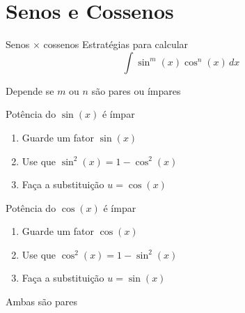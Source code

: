 \documentclass[fleqn,utf8,aspectratio=169,12pt]{beamer}
\begin{document}
\section{Senos e Cossenos}

\begin{frame}{Senos $\times$ cossenos}
  Estratégias para calcular
  \[
    \int \sin^m(x) \cos^n(x)\,dx
  \]

  Depende se $m$ ou $n$ são pares ou ímpares
\end{frame}

\begin{frame}{Potência do $\sin(x)$ é ímpar}
  \begin{enumerate}[<+->]
    \setlength\itemsep{1em}
    \item Guarde um fator $\sin(x)$
    \item Use que $\sin^2(x) = 1 - \cos^2(x)$
    \item Faça a substituição $u=\cos(x)$
  \end{enumerate}
\end{frame}

\begin{frame}{Potência do $\cos(x)$ é ímpar}
  \begin{enumerate}[<+->]
    \setlength\itemsep{1em}
    \item Guarde um fator $\cos(x)$
    \item Use que $\cos^2(x) = 1 - \sin^2(x)$
    \item Faça a substituição $u=\sin(x)$
  \end{enumerate}
\end{frame}

\begin{frame}{Ambas são pares}


\end{frame}
\end{document}
